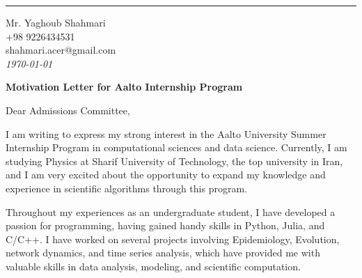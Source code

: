 \documentclass[
	12pt, %
]{letter}
\begin{document}

\vspace*{-1.25cm} %

\vspace{-0.5cm} %

\rule{\linewidth}{1pt} %

\medskip %


\begingroup
	\raggedleft %
	\small %
	Mr. Yaghoub Shahmari \\ %
	+98 9226434531 \\ %
	shahmari.acer@gmail.com\\ %
	\bigskip %
	{\normalsize\textit{\today}}\\ %
\endgroup


\textbf{Motivation Letter for Aalto Internship Program}

\medskip %

Dear Admissions Committee,

\smallskip %


I am writing to express my strong interest in the Aalto University Summer Internship Program in computational sciences and data science. Currently, I am studying Physics at Sharif University of Technology, the top university in Iran, and I am very excited about the opportunity to expand my knowledge and experience in scientific algorithms through this program.

Throughout my experiences as an undergraduate student, I have developed a passion for programming, having gained handy skills in Python, Julia, and C/C++. I have worked on several projects involving Epidemiology, Evolution, network dynamics, and time series analysis, which have provided me with valuable skills in data analysis, modeling, and scientific computation.
\end{document}
